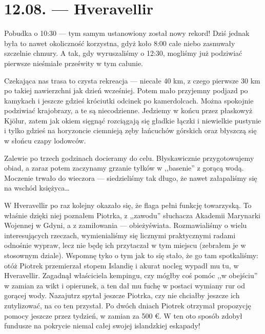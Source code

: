 \chapter*{12.08. --- Hveravellir}

Pobudka o 10:30 --- tym samym ustanowiony został nowy rekord! Dziś jednak była to nawet okoliczność korzystna, gdyż koło 8:00 całe niebo zasnuwały szczelnie chmury. A tak, gdy wyruszaliśmy o 12:30, mogliśmy już podziwiać pierwsze nieśmiałe prześwity w tym całunie.

Czekająca nas trasa to czysta rekreacja --- niecałe 40 km, z czego pierwsze 30 km po takiej nawierzchni jak dzień wcześniej. Potem mało przyjemny podjazd po kamykach i jeszcze gdzieś króciutki odcinek po kamerdolcach. Można spokojnie podziwiać krajobrazy, a te są niecodzienne. Jedziemy w końcu przez płaskowyż Kjölur, zatem jak okiem sięgnąć rozciągają się gładkie łączki i niewielkie pustynie i tylko gdzieś na horyzoncie ciemnieją zęby łańcuchów górskich oraz błyszczą się w słońcu czapy lodowców.

Zalewie po trzech godzinach docieramy do celu. Błyskawicznie przygotowujemy obiad, a zaraz potem  zaczynamy grzanie tyłków w ,,basenie'' z gorącą wodą. Moczenie trwało do wieczora --- siedzieliśmy tak długo, że nawet załapaliśmy się na wschód księżyca…

W Hveravellir po raz kolejny okazało się, że flaga pełni funkcję towarzyską. To właśnie dzięki niej poznałem Piotrka, z ,,zawodu'' słuchacza Akademii Marynarki Wojennej w Gdyni, a z zamiłowania --- obieżyświata. Rozmawialiśmy o wielu interesujących rzeczach, wymienialiśmy się licznymi praktycznymi radami odnośnie wypraw, lecz nie będę ich przytaczał w tym miejscu (zebrałem je w stosownym dziale). Wspomnę tyko o tym jak to się stało, że go tam spotkaliśmy: otóż Piotrek przemierzał stopem Islandię i akurat nocleg wypadł mu tu, w Hveravellir. Zagadnął właściciela kempingu, czy mógłby coś pomóc ,,w obejściu'' w zamian za wikt i opierunek, a ten dał mu fuchę w postaci wymiany rur od gorącej wody. Nazajutrz spytał jeszcze Piotrka, czy nie chciałby jeszcze ich zutylizować, na co ten przystał. Po dwóch dniach Piotrek otrzymał propozycję pomocy jeszcze przez tydzień, w zamian za 500 €. W ten oto sposób zdobył fundusze na pokrycie niemal całej swojej islandzkiej eskapady!


